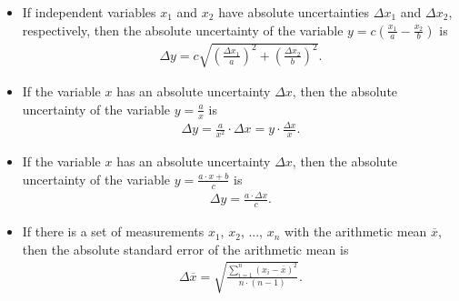 \begin{itemize}

\item If independent variables $x_{1}$ and $x_{2}$ have absolute uncertainties $\Delta x_{1}$ and $\Delta x_{2}$, respectively, then the absolute uncertainty of the variable $y=c(\frac{x_{1}}{a} - \frac{x_{2}}{b})$ is
\begin{equation}
\begin{aligned}
\Delta y = c\sqrt{\left (\frac{ \Delta x_{1}}{a} \right )^{2} + \left (\frac{ \Delta x_{2}}{b} \right )^{2}}.
\label{eq:err_subtr}
\end{aligned}
\end{equation}


\item If the variable $x$ has an absolute uncertainty $\Delta x$, then the absolute uncertainty of the variable $y=\frac{a}{x}$ is
\begin{equation}
\begin{aligned}
\Delta y = \frac{a}{x^{2}}\cdot \Delta x = y\cdot \frac{\Delta x}{x}.
\label{eq:err_frac}
\end{aligned}
\end{equation}


\item If the variable $x$ has an absolute uncertainty $\Delta x$, then the absolute uncertainty of the variable $y=\frac{a\cdot x +b}{c}$ is
\begin{equation}
\begin{aligned}
\Delta y = \frac{a\cdot \Delta x}{c}.
\label{eq:err_prod}
\end{aligned}
\end{equation}



\item If there is a set of measurements $x_{1}$, $x_{2}$, ..., $x_{n}$ with the arithmetic mean $\overline{x}$, then the absolute standard error of the arithmetic mean is
\begin{equation}
\begin{aligned}
\Delta \overline{x} = \sqrt{\frac{\sum\limits_{i=1}^{n} (x_{i}-\overline{x})^{2}}{n\cdot(n-1)}}.
\label{eq:err_arith_mean}
\end{aligned}
\end{equation}

\end{itemize}


\renewcommand{\thechapter}{D}
    \makeatletter
   \renewcommand{\theequation}{\thechapter.\@arabic\c@equation}
    \makeatother
